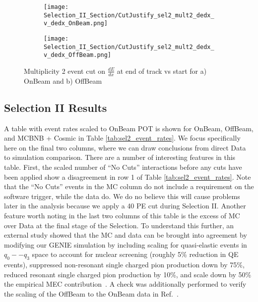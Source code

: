 \documentclass{article}
\begin{document}
\begin{figure}[h!]
\centering
\begin{subfigure}[t]{0.25\textwidth}
    \centering
\texttt{[image: Selection\_II\_Section/CutJustify\_sel2\_mult2\_dedx\_v\_dedx\_OnBeam.png]}
    \caption{ }
  \end{subfigure} 
  \hspace{1mm}
  \begin{subfigure}[t]{0.25\textwidth}
    \centering
    \texttt{[image: Selection\_II\_Section/CutJustify\_sel2\_mult2\_dedx\_v\_dedx\_OffBeam.png]}
    \caption{ }
  \end{subfigure} 

\caption{ Multiplicity 2 event cut on $\frac{dE}{dx}$ at end of track vs start for a) OnBeam and b) OffBeam }
\label{fig:cutjust_sel2_onbeam_mult2_dedx_v_dedx}
\end{figure}

\clearpage
\subsection{Selection II Results}
\par A table with event rates scaled to OnBeam POT is shown for OnBeam, OffBeam, and MCBNB + Cosmic in Table \ref{tab:sel2_event_rates}. We focus specifically here on the final two columns, where we can draw conclusions from direct Data to simulation comparison. There are a number of interesting features in this table.  First, the scaled number of ``No Cuts'' interactions before any cuts have been applied show a disagreement in row 1 of Table \ref{tab:sel2_event_rates}.  Note that the ``No Cuts'' events in the MC column do not include a requirement on the software trigger, while the data do.  We do no believe this will cause problems later in the analysis because we apply a 40 PE cut during Selection II.  Another feature worth noting in the last two columns of this table is the excess of MC over Data at the final stage of the Selection. To understand this further, an external study showed that the MC and data can be brought into agreement by modifying our GENIE simulation by including scaling for quasi-elastic events in $q_0 -- q_3$ space to account for nuclear screening (roughly 5\% reduction in QE events), suppressed non-resonant single charged pion production down by 75\%, reduced resonant single charged pion production by 10\%, and scale down by 50\% the empirical MEC contribution~\cite{bib:jaz_datamc_agreement}.  A check was additionally performed to verify the scaling of the OffBeam to the OnBeam data in Ref.~\cite{bib:davidcpot}. 
\end{document}
